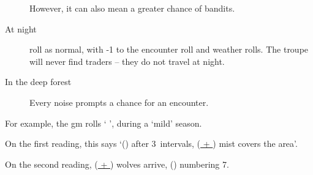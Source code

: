 \begin{multicols}{2}
\begin{description}
  However, it can also mean a greater chance of bandits.

  \item[At night]
  roll as normal, with -1 to the encounter roll and weather rolls.
  The troupe will never find traders -- they do not travel at night.
  \item[In the deep forest]
  Every noise prompts a chance for an encounter.
\end{description}

\begin{exampletext}
  For example, the \gls{gm} rolls `  ', during a `mild' season.

  On the first reading, this says `() after 3~\glspl{interval}, (\underline{ + }) mist covers the area'.

  On the second reading, (\underline{ + }) wolves arrive, () numbering 7.


\end{exampletext}

\end{multicols}

\setcounter{diceNo}{13}
\setcounter{diceNo2}{15}
\setcounter{enc}{17}


